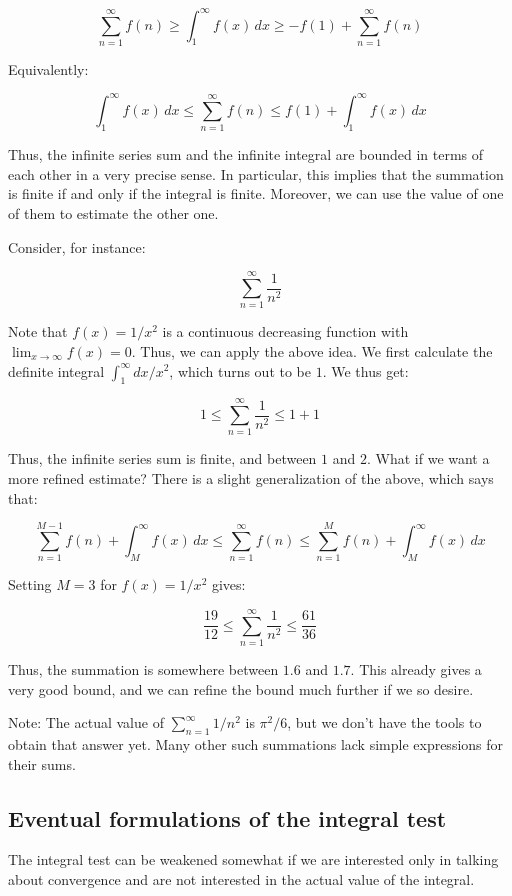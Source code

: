 \documentclass{amsart}
\begin{document}
$$\sum_{n=1}^\infty f(n) \ge \int_1^\infty f(x) \, dx \ge -f(1) + \sum_{n=1}^\infty f(n)$$

Equivalently:

$$\int_1^\infty f(x) \, dx \le \sum_{n=1}^\infty f(n) \le f(1) + \int_1^\infty f(x) \, dx$$

Thus, the infinite series sum and the infinite integral are bounded in terms
of each other in a very precise sense. In particular, this implies
that the summation is finite if and only if the integral is
finite. Moreover, we can use the value of one of them to estimate the
other one.

Consider, for instance:

$$\sum_{n=1}^\infty \frac{1}{n^2}$$

Note that $f(x) = 1/x^2$ is a continuous decreasing function with
$\lim_{x \to \infty} f(x) = 0$. Thus, we can apply the above idea. We
first calculate the definite integral $\int_1^\infty dx/x^2$, which
turns out to be $1$. We thus get:

$$1 \le \sum_{n=1}^\infty \frac{1}{n^2} \le 1 + 1$$

Thus, the infinite series sum is finite, and between $1$ and $2$. What
if we want a more refined estimate? There is a slight generalization
of the above, which says that:

$$\sum_{n=1}^{M-1} f(n) + \int_M^\infty f(x) \, dx \le \sum_{n=1}^\infty f(n) \le \sum_{n=1}^M f(n) + \int_M^\infty f(x) \, dx$$

Setting $M = 3$ for $f(x) = 1/x^2$ gives:

$$\frac{19}{12} \le \sum_{n=1}^\infty \frac{1}{n^2} \le \frac{61}{36}$$

Thus, the summation is somewhere between $1.6$ and $1.7$. This already
gives a very good bound, and we can refine the bound much further if
we so desire.

Note: The actual value of $\sum_{n=1}^\infty 1/n^2$ is $\pi^2/6$, but
we don't have the tools to obtain that answer yet. Many other such
summations lack simple expressions for their sums.

\subsection{Eventual formulations of the integral test}

The integral test can be weakened somewhat if we are interested only
in talking about convergence and are not interested in the actual
value of the integral.
\end{document}
